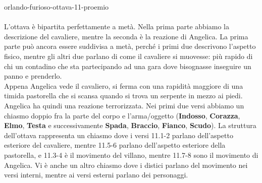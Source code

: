 \documentclass[preview]{standalone}
\begin{document}
\begin{snippet}{orlando-furioso-ottava-11-proemio}
    \\\\
    L'ottava è bipartita perfettamente a metà.
    Nella prima parte abbiamo la descrizione del cavaliere,
    mentre la seconda è la reazione di Angelica.
    La prima parte può ancora essere suddivisa a metà, perché i primi
    due descrivono l'aspetto fisico, mentre gli altri due parlano di 
    come il cavaliere si muovesse: più rapido di
    chi un contadino che sta partecipando ad una gara
    dove bisognasse inseguire un panno e prenderlo.
    \\ Appena Angelica vede il cavaliero, si ferma con una rapidità
    maggiore di una timida pastorella che si scansa quando si trova un
    serpente in mezzo ai piedi.
    Angelica ha quindi una reazione terrorizzata.
    Nei primi due versi abbiamo un chiasmo doppio fra la parte del corpo
    e l'arma/oggetto (\textbf{Indosso}, \textbf{Corazza}, \textbf{Elmo}, \textbf{Testa}
    e successivamente \textbf{Spada}, \textbf{Braccio}, \textbf{Fianco}, \textbf{Scudo}).
    La struttura dell'ottava rappresenta un chiasmo dove i versi 11.1-2 parlano
    dell'aspetto esteriore del cavaliere, mentre 11.5-6 parlano dell'aspetto esteriore della pastorella,
    e 11.3-4 è il movimento del villano, mentre 11.7-8 sono il movimento di Angelica.
    Vi è anche un altro chiasmo dove i distici parlano del movimento nei versi interni, mentre ai versi esterni
    parlano dei personaggi.
\end{snippet}
\end{document}
